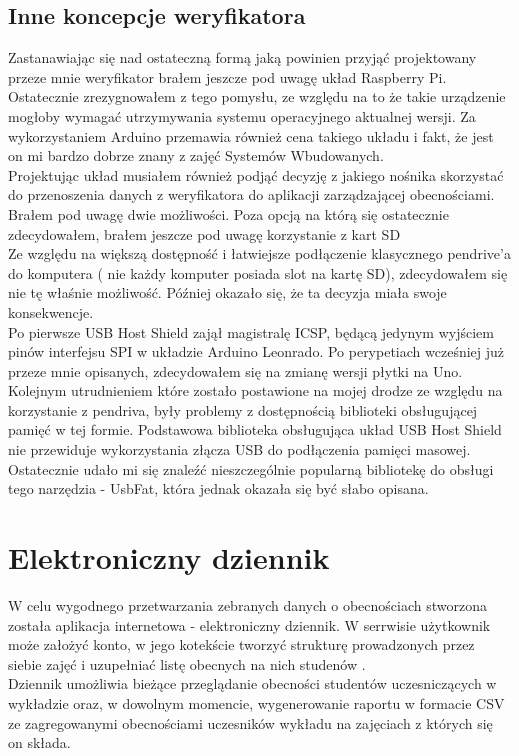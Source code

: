 \documentclass[declaration,shortabstract, mgr]{iithesis}
\begin{document}
\subsection{Inne koncepcje weryfikatora}
\indent Zastanawiając się nad ostateczną formą jaką powinien przyjąć projektowany przeze mnie weryfikator brałem jeszcze pod uwagę układ Raspberry Pi. Ostatecznie zrezygnowałem z tego pomysłu, ze względu na to że takie urządzenie mogłoby wymagać utrzymywania systemu operacyjnego aktualnej wersji. Za wykorzystaniem Arduino przemawia również cena takiego układu i fakt, że jest on mi bardzo dobrze znany z zajęć Systemów Wbudowanych.\\
\indent Projektując układ musiałem również podjąć decyzję z jakiego nośnika skorzystać do przenoszenia danych z weryfikatora do aplikacji zarządzającej obecnościami. Brałem pod uwagę dwie możliwości. Poza opcją na którą się ostatecznie zdecydowałem, brałem jeszcze pod uwagę korzystanie z kart SD \\
\indent Ze względu na większą dostępność i łatwiejsze podłączenie klasycznego pendrive'a do komputera ( nie każdy komputer posiada slot na kartę SD), zdecydowałem się nie tę właśnie możliwość. Później okazało się, że ta decyzja miała swoje konsekwencje.\\
\indent Po pierwsze USB Host Shield zajął magistralę ICSP, będącą jedynym wyjściem pinów interfejsu SPI w układzie Arduino Leonrado. Po perypetiach wcześniej już przeze mnie opisanych, zdecydowałem się na zmianę wersji płytki na Uno. \\
\indent Kolejnym utrudnieniem które zostało postawione na mojej drodze ze względu na korzystanie z pendriva, były problemy z dostępnością biblioteki obsługującej pamięć w tej formie. Podstawowa biblioteka obsługująca układ USB Host Shield nie przewiduje wykorzystania złącza USB do podłączenia pamięci masowej. \\
\indent Ostatecznie udało mi się znaleźć nieszczególnie popularną bibliotekę do obsługi tego narzędzia - UsbFat, która jednak okazała się być słabo opisana.

\section{Elektroniczny dziennik}
\indent W celu wygodnego przetwarzania zebranych danych o obecnościach stworzona została aplikacja internetowa - elektroniczny dziennik. W serrwisie użytkownik może założyć konto, w jego kotekście tworzyć strukturę prowadzonych przez siebie zajęć i uzupełniać listę obecnych na nich studenów .\\
\indent Dziennik umożliwia bieżące przeglądanie obecności studentów uczesniczących w wykładzie oraz, w dowolnym momencie, wygenerowanie raportu w formacie CSV ze zagregowanymi obecnościami uczesników wykładu na zajęciach z których się on składa.
\end{document}
